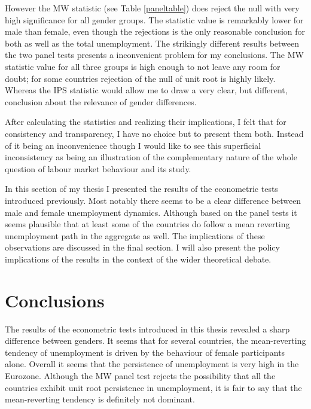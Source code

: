 \documentclass[12pt,a4paper,english]{article}
\begin{document}
%

However the MW statistic (see Table \ref{paneltable}) does reject the null with very high significance for all gender groups. The statistic value is remarkably lower for male than female, even though the rejections is the only reasonable conclusion for both as well as the total unemployment. The strikingly different results between the two panel tests presents a inconvenient problem for my conclusions. The MW statistic value for all three groups is high enough to not leave any room for doubt; for some countries rejection of the null of unit root is highly likely. Whereas the IPS statistic would allow me to draw a very clear, but different, conclusion about the relevance of gender differences.

After calculating the statistics and realizing their implications, I felt that for consistency and transparency, I have no choice but to present them both. Instead of it being an inconvenience though I would like to see this superficial inconsistency as being an illustration of the complementary nature of the whole question of labour market behaviour and its study.

In this section of my thesis I presented the results of the econometric tests introduced previously. Most notably there seems to be a clear difference between male and female unemployment dynamics. Although based on the panel tests it seems plausible that at least some of the countries do follow a mean reverting unemployment path in the aggregate as well. The implications of these observations are discussed in the final section. I will also present the policy implications of the results in the context of the wider theoretical debate.

\clearpage
\section{Conclusions}

The results of the econometric tests introduced in this thesis revealed a sharp difference between genders. It seems that for several countries, the mean-reverting tendency of unemployment is driven by the behaviour of female participants alone. Overall it seems that the persistence of unemployment is very high in the Eurozone. Although the MW panel test rejects the possibility that all the countries exhibit unit root persistence in unemployment, it is fair to say that the mean-reverting tendency is definitely not dominant.
\end{document}
